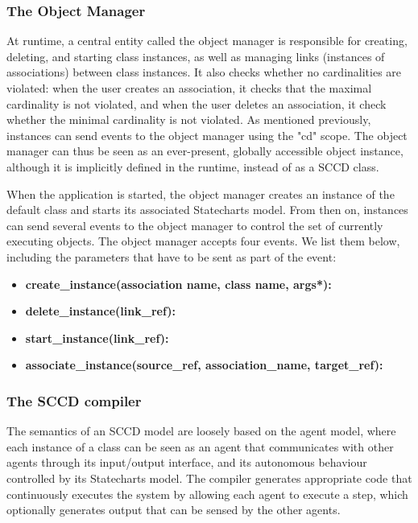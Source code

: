 \subsubsection{The Object Manager}
At runtime, a central entity called the object manager is responsible for creating, deleting, and starting class instances, as 
well as managing links (instances of associations) between class instances. It also checks whether no cardinalities are violated: 
when the user creates an association, it checks that the maximal cardinality is not violated, and when the user deletes an 
association, it check whether the minimal cardinality is not violated. As mentioned previously, instances can send events to the 
object manager using the "cd" scope. The object manager can thus be seen as an ever-present, globally accessible object instance, 
although it is implicitly defined in the runtime, instead of as a SCCD class.

When the application is started, the object manager creates an instance of the default class and starts its associated Statecharts 
model. From then on, instances can send several events to the object manager to control the set of currently executing objects. 
The object manager accepts four events. We list them below, including the parameters that have to be sent as part of the event:
\begin{itemize}
    \item \textbf{create\_instance(association name, class name, args*):}
    \item \textbf{delete\_instance(link\_ref):}
    \item \textbf{start\_instance(link\_ref):}
    \item \textbf{associate\_instance(source\_ref, association\_name, target\_ref):}
\end{itemize}


\subsubsection{The SCCD compiler}
The semantics of an SCCD model are loosely based on the agent model, where each instance of a class can be seen as an agent that 
communicates with other agents through its input/output interface, and its autonomous behaviour controlled by its Statecharts 
model. The compiler generates appropriate code that continuously executes the system by allowing each agent to execute a step, 
which optionally generates output that can be sensed by the other agents.

